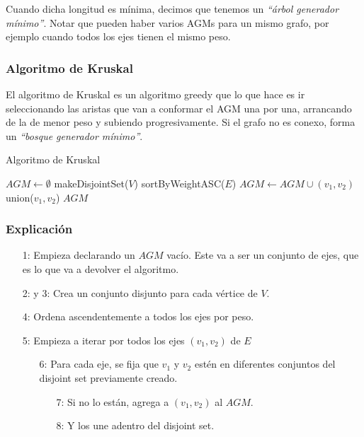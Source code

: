 Cuando dicha longitud es m\'inima, decimos que tenemos un \emph{``\'arbol generador m\'inimo''}. Notar que pueden haber varios AGMs para un mismo grafo, por ejemplo cuando todos los ejes tienen el mismo peso.

\newpage
\subsubsection{Algoritmo de Kruskal}

El algoritmo de Kruskal es un algoritmo greedy que lo que hace es ir seleccionando las aristas que van a conformar el AGM una por una, arrancando de la de menor peso y subiendo progresivamente. Si el grafo no es conexo, forma un \emph{``bosque generador m\'inimo''}.

\begin{algorithm}
\caption{Algoritmo de Kruskal}
\begin{algorithmic}[1]
\State $AGM \gets \emptyset$
  \State makeDisjointSet($V$)
\EndFor
\State sortByWeightASC($E$)
    \State $AGM \gets AGM \cup (v_1, v_2)$
    \State union($v_1, v_2$)
  \EndIf
\EndFor
\Return $AGM$
\end{algorithmic}
\end{algorithm}

\subsubsection*{Explicaci\'on}

\begin{enumerate}
\item [1:] Empieza declarando un $AGM$ vac\'io. Este va a ser un conjunto de ejes, que es lo que va a devolver el algoritmo.
\item [2: y 3:] Crea un conjunto disjunto para cada v\'ertice de $V$.
\item [4:] Ordena ascendentemente a todos los ejes por peso.
\item [5:] Empieza a iterar por todos los ejes $(v_1, v_2)$ de $E$
  \begin{enumerate}
  \item [6:] Para cada eje, se fija que $v_1$ y $v_2$ est\'en en diferentes conjuntos del disjoint set previamente creado.
    \begin{enumerate}
    \item [7:] Si no lo est\'an, agrega a $(v_1, v_2)$ al $AGM$.
    \item [8:] Y los une adentro del disjoint set.
    \end{enumerate}
  \end{enumerate}
\end{enumerate}

